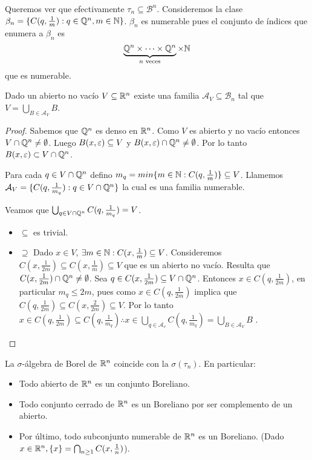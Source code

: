 Queremos ver que efectivamente $\tau_n \subseteq \mathcal{B}^n$.
Consideremos la clase $\beta_n = \{ C(q, \frac{1}{m}) : q \in \mathbb{Q}^n, m \in \mathbb{N} \}$.
$\beta_n$ es numerable pues el conjunto de índices que enumera a $\beta_n$ es
\[ \underbrace{\mathbb{Q}^n \times \cdots \times \mathbb{Q}^n}_{n \text{ veces}} \times \mathbb{N} \] que es numerable.

\begin{prop}
    Dado un abierto no vacío $V \subseteq \mathbb{R}^n$ existe una familia $\mathcal{A}_V \subseteq \mathcal{B}_n$ tal que
    $V = \bigcup_{B \in \mathcal{A}_V} B$.

    \begin{proof}
        Sabemos que $\mathbb{Q}^n$ es denso en $\mathbb{R}^n$. Como $V$ es abierto y no vacío entonces $V \cap \mathbb{Q}^n \neq \emptyset$.
        Luego $B(x, \varepsilon) \subseteq V$ y $B(x, \varepsilon) \cap \mathbb{Q}^n \neq \emptyset$. Por lo tanto $B(x, \varepsilon) \subset V \cap \mathbb{Q}^n$.

        Para cada $q \in V \cap \mathbb{Q}^n$ defino $m_q = min\{ m \in \mathbb{N} : C(q, \frac{1}{m}) \} \subseteq V$.
        Llamemos $\mathcal{A}_V = \{ C(q, \frac{1}{m_q}) : q \in V \cap \mathbb{Q}^n \}$ la cual es una familia numerable.
        
        Veamos que $\bigcup_{q \in V \cap \mathbb{Q}^n} C(q, \frac{1}{m_q}) = V$.
        \begin{itemize}
            \item $\subseteq$ es trivial.
            \item $\supseteq$ Dado $x \in V$, $\exists m \in \mathbb{N} : C(x, \frac{1}{m}) \subseteq V$. Consideremos
            $C(x, \frac{1}{2m}) \subseteq C(x, \frac{1}{m}) \subseteq V$ que es un abierto no vacío.
            Resulta que $C(x, \frac{1}{2m}) \cap \mathbb{Q}^n \neq \emptyset$.
            Sea $q \in C(x, \frac{1}{2m}) \subseteq V \cap \mathbb{Q}^n$. Entonces
            $x \in C(q, \frac{1}{2m})$, en particular $m_q \leq 2m$, pues como $x \in C(q, \frac{1}{2m})$
            implica que $C(q, \frac{1}{2m}) \subseteq C(x, \frac{2}{2m}) \subseteq V$.
            Por lo tanto $x \in C(q, \frac{1}{2m}) \subseteq C(q, \frac{1}{m_q}) \therefore x \in \bigcup_{q \in \mathcal{A}_v} C(q, \frac{1}{m_q}) = \bigcup_{B \in \mathcal{A}_V} B$ .
        \end{itemize}
    \end{proof}
\end{prop}

\begin{corollary}
    La $\sigma$-álgebra de Borel de $\mathbb{R}^n$ coincide con la $\sigma(\tau_n)$. En particular:
    \begin{itemize}
        \item Todo abierto de $\mathbb{R}^n$ es un conjunto Boreliano.
        \item Todo conjunto cerrado de $\mathbb{R}^n$ es un Boreliano por ser complemento de un abierto.
        \item Por último, todo subconjunto numerable de $\mathbb{R}^n$ es un Boreliano. (Dado $x \in \mathbb{R}^n, \{ x \} = \bigcap_{n \geq 1}C(x, \frac{1}{n})$).
    \end{itemize}
\end{corollary}

